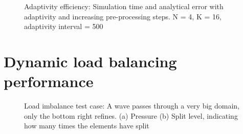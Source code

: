 \begin{figure}[H]
	\centering
	
	\caption{Adaptivity efficiency: Simulation time and analytical error with adaptivity and increasing pre-processing steps. N = 4, K = 16, adaptivity interval = 500}
	\label{fig:adaptivity_efficiency_C500}
\end{figure}

\section{Dynamic load balancing performance} \label{section:results:load_balancing_performance}

\begin{figure}[H]
	\centering
	\hfill
	\caption{Load imbalance test case: A wave passes through a very big domain, only the bottom right refines. (a) Pressure (b) Split level, indicating how many times the elements have split}
	\label{fig:load_imbalance_case}
\end{figure}

